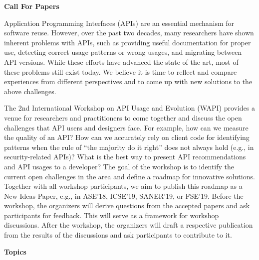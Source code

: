 \documentclass[10pt, conference]{IEEEtran}
\newcommand{\updated}[1]{#1}
\newcommand{\shortname}{WAPI}
\begin{document}



\newpage
\onecolumn

\begin{center}
\Large{\textbf{Call For Papers}}
\end{center}

Application Programming Interfaces (APIs) are an essential mechanism for software reuse. However, over the past two decades, many researchers have shown inherent problems with APIs, such as providing useful documentation for proper use, detecting correct usage patterns or wrong usages, and migrating between API versions. While these efforts have advanced the state of the art, most of these problems still exist today. We believe it is time to reflect and compare experiences from different perspectives and to come up with new solutions to the above challenges. 

The 2nd International Workshop on API Usage and Evolution (\shortname{}) provides a venue for researchers and practitioners to come together and discuss the open challenges that API users and designers face. For example, how can we measure the quality of an API\@? How can we accurately rely on client code for identifying patterns when the rule of ``the majority do it right'' does not always hold (e.g., in security-related APIs)? What is the best way to present API recommendations and API usages to a developer?
%
\updated{The goal of the workshop is to identify the current open challenges in the area and define a roadmap for innovative solutions. Together with all workshop participants, we aim to publish this roadmap as a New Ideas Paper, e.g., in ASE'18, ICSE'19, SANER'19, or FSE'19.
Before the workshop, the organizers will derive questions from the accepted papers and ask participants for feedback. This will serve as a framework for workshop discussions. After the workshop, the organizers will draft a respective publication from the results of the discussions and ask participants to contribute to it.}


\vspace{0.2cm}

\noindent
\textbf{\large Topics}
\vspace{0.2cm}
\end{document}
